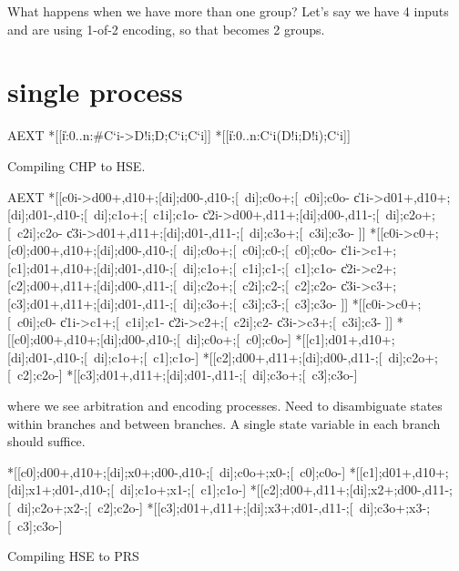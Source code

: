 \documentclass[aer.tex]{subfiles}
\begin{document}

What happens when we have more than one group? Let's say we have 4 inputs and are using 1-of-2 encoding, so that becomes 2 groups.

\section{single process}

\begin{csp}
AEXT\equiv
  *[[\langle\|i:0..n:#{C`i}->D!i;D;C`i;C`i\rangle]]
\equiv
  *[[\langle\|i:0..n:C`i\star(D!i;D!i);C`i\rangle]]
\end{csp}

\noindent Compiling CHP to HSE.

\begin{hse}
AEXT
\equiv
  *[[c0i->d00+,d10+;[di];d00-,d10-;[~di];c0o+;[~c0i];c0o-
    \|c1i->d01+,d10+;[di];d01-,d10-;[~di];c1o+;[~c1i];c1o-
    \|c2i->d00+,d11+;[di];d00-,d11-;[~di];c2o+;[~c2i];c2o-
    \|c3i->d01+,d11+;[di];d01-,d11-;[~di];c3o+;[~c3i];c3o-
   ]]
\equiv
  *[[c0i->c0+;[c0];d00+,d10+;[di];d00-,d10-;[~di];c0o+;[~c0i];c0-;[~c0];c0o-
    \|c1i->c1+;[c1];d01+,d10+;[di];d01-,d10-;[~di];c1o+;[~c1i];c1-;[~c1];c1o-
    \|c2i->c2+;[c2];d00+,d11+;[di];d00-,d11-;[~di];c2o+;[~c2i];c2-;[~c2];c2o-
    \|c3i->c3+;[c3];d01+,d11+;[di];d01-,d11-;[~di];c3o+;[~c3i];c3-;[~c3];c3o-
   ]]
\equiv
  *[[c0i->c0+;[~c0i];c0-
    \|c1i->c1+;[~c1i];c1-
    \|c2i->c2+;[~c2i];c2-
    \|c3i->c3+;[~c3i];c3-
   ]] \pll
  *[[c0];d00+,d10+;[di];d00-,d10-;[~di];c0o+;[~c0];c0o-] \pll
  *[[c1];d01+,d10+;[di];d01-,d10-;[~di];c1o+;[~c1];c1o-] \pll
  *[[c2];d00+,d11+;[di];d00-,d11-;[~di];c2o+;[~c2];c2o-] \pll
  *[[c3];d01+,d11+;[di];d01-,d11-;[~di];c3o+;[~c3];c3o-]
\end{hse}

\noindent where we see arbitration and encoding processes. Need to disambiguate states within branches and between branches. A single state variable in each branch should suffice.

\begin{hse}
*[[c0];d00+,d10+;[di];x0+;d00-,d10-;[~di];c0o+;x0-;[~c0];c0o-] \pll
*[[c1];d01+,d10+;[di];x1+;d01-,d10-;[~di];c1o+;x1-;[~c1];c1o-] \pll
*[[c2];d00+,d11+;[di];x2+;d00-,d11-;[~di];c2o+;x2-;[~c2];c2o-] \pll
*[[c3];d01+,d11+;[di];x3+;d01-,d11-;[~di];c3o+;x3-;[~c3];c3o-]
\end{hse}

\noindent Compiling HSE to PRS
\end{document}

